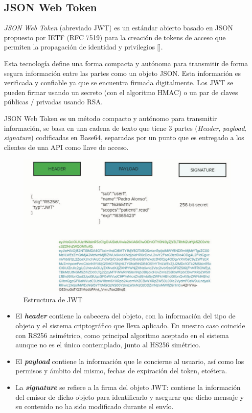 \subsection*{JSON Web Token}
\textit{JSON Web Token }(abreviado JWT) es un estándar abierto basado en JSON propuesto por IETF (RFC 7519) para la creación de tokens de acceso que permiten la propagación de identidad y privilegios [\cite{bradley_sakimura_jones_2015}].

Esta tecnología define una forma compacta y autónoma para transmitir de forma segura información entre las partes como un objeto JSON. Esta información es verificada y confiable ya que se encuentra firmada digitalmente. Los JWT se pueden firmar usando un secreto (con el algoritmo HMAC) o un par de claves públicas / privadas usando RSA.

JSON Web Token es un método compacto y autónomo para transmitir información, se basa en una cadena de texto que tiene 3 partes (\textit{Header}, \textit{payload}, \textit{signature}) codificadas en Base64, separadas por un punto que es entregado a los clientes de una API como llave de acceso.

\begin{figure}[H]
	\centering
	\includegraphics[width=0.9\linewidth]{"Graphics/estructura de un objeto JWS"}
	\caption{Estructura de JWT}
	\label{fig:estructura-de-un-objeto-jws}
\end{figure}

\begin{itemize}
	\item El \textit{\textbf{header}} contiene la cabecera del objeto, con la información del tipo de objeto y el sistema criptográfico que lleva aplicado. En nuestro caso coincide con RS256 asimétrico, como principal algoritmo aceptado en el sistema aunque no es el único contemplado, junto al HS256 simétrico. 
	\item El \textit{\textbf{payload}} contiene la información que le concierne al usuario, así como los permisos y ámbito del mismo, fechas de expiración del token, etcétera. 
	\item La \textit{\textbf{signature}} se refiere a la firma del objeto JWT: contiene la información del emisor de dicho objeto para identificarlo y asegurar que dicho mensaje y su contenido no ha sido modificado durante el envío. 
\end{itemize}

